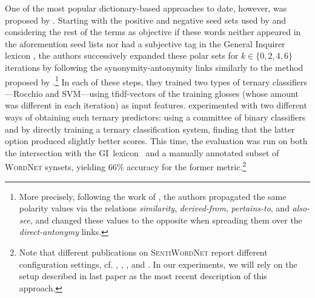 
One of the most popular dictionary-based approaches to date, however,
was proposed by \citet{Esuli:06c}.  Starting with the positive and
negative seed sets used by \citet{Turney:03} and considering the rest
of the terms as objective if these words neither appeared in the
aforemention seed lists nor had a subjective tag in the General
Inquirer lexicon \cite{Stone:66}, the authors successively expanded
these polar sets for $k \in \{0, 2, 4, 6\}$ iterations by following
the synonymity-antonymity links similarly to the method proposed by
\citet{Hu:04}.\footnote{More precisely, following the work of
  \citet{Strapparava:04}, the authors propagated the same polarity
  values via the relations \emph{similarity}, \emph{derived-from},
  \emph{pertains-to}, and \emph{also-see}, and changed these values to
  the opposite when spreading them over the \emph{direct-antonymy}
  links.}  In each of these steps, they trained two types of ternary
classifiers---Rocchio and SVM---using tfidf-vectors of the training
glosses (whose amount was different in each iteration) as input
features.  \citet{Esuli:06c} experimented with two different ways of
obtaining such ternary predictors: using a committee of binary
classifiers and by directly training a ternary classification system,
finding that the latter option produced slightly better scores.  This
time, the evaluation was run on both the intersection with the
GI~lexicon~\cite{Stone:66} and a manually annotated subset of
\textsc{WordNet} synsets, yielding 66\% accuracy for the former
metric.\footnote{Note that different publications on
  \textsc{SentiWordNet} report different configuration settings,
  cf. \citet{Esuli:05}, \citet{Esuli:06a}, \citet{Esuli:06b}, and
  \citet{Esuli:06c}.  In our experiments, we will rely on the setup
  described in last paper as the most recent description of this
  approach.}


